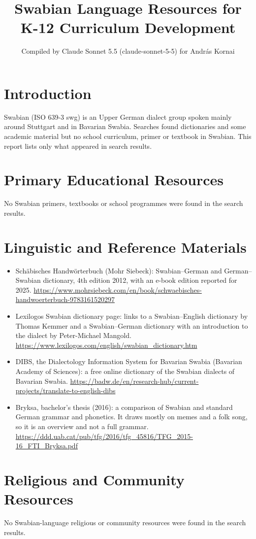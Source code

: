 \documentclass[12pt]{article}
\title{Swabian Language Resources for K-12 Curriculum Development}
\author{Compiled by Claude Sonnet 5.5 (claude-sonnet-5-5) for Andr\'as Kornai}
\date{}
\begin{document}
\maketitle

\section{Introduction}
Swabian (ISO 639-3 swg) is an Upper German dialect group spoken mainly around Stuttgart and in Bavarian Swabia. Searches found dictionaries and some academic material but no school curriculum, primer or textbook in Swabian. This report lists only what appeared in search results.

\section{Primary Educational Resources}
No Swabian primers, textbooks or school programmes were found in the search results.

\section{Linguistic and Reference Materials}
\begin{itemize}
\item Sch\"abisches Handw\"orterbuch (Mohr Siebeck): Swabian--German and German--Swabian dictionary, 4th edition 2012, with an e-book edition reported for 2025. \url{https://www.mohrsiebeck.com/en/book/schwaebisches-handwoerterbuch-9783161520297}
\item Lexilogos Swabian dictionary page: links to a Swabian--English dictionary by Thomas Kemmer and a Swabian--German dictionary with an introduction to the dialect by Peter-Michael Mangold. \url{https://www.lexilogos.com/english/swabian_dictionary.htm}
\item DIBS, the Dialectology Information System for Bavarian Swabia (Bavarian Academy of Sciences): a free online dictionary of the Swabian dialects of Bavarian Swabia. \url{https://badw.de/en/research-hub/current-projects/translate-to-english-dibs}
\item Bryksa, bachelor's thesis (2016): a comparison of Swabian and standard German grammar and phonetics. It draws mostly on memes and a folk song, so it is an overview and not a full grammar. \url{https://ddd.uab.cat/pub/tfg/2016/tfg_45816/TFG_2015-16_FTI_Bryksa.pdf}
\end{itemize}

\section{Religious and Community Resources}
No Swabian-language religious or community resources were found in the search results.
\end{document}
